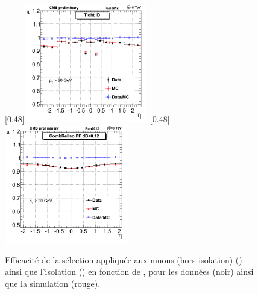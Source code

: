 \begin{figure}[tbp] \centering
    \subcaptionbox{\label{fig:muon_id_eff}}[0.48\textwidth]{\includegraphics[width=0.48\textwidth]{chapitre7/figs/muon_id_efficiency.png}} \hfill
    \subcaptionbox{\label{fig:muon_iso_eff}}[0.48\textwidth]{\includegraphics[width=0.48\textwidth]{chapitre7/figs/muon_iso_efficiency.png}}
    \caption{Efficacité de la sélection appliquée aux muons (hors isolation) () ainsi que l'isolation () en fonction de \aeta, pour les données (noir) ainsi que la simulation (rouge).}
\end{figure}

